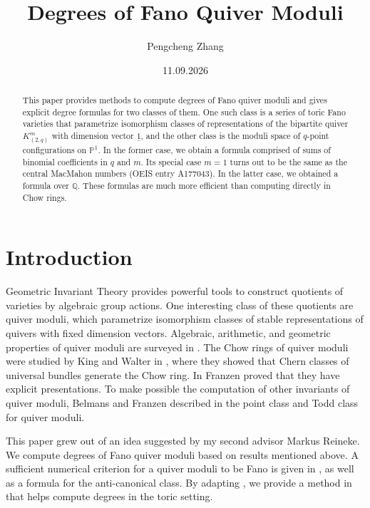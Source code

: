 \documentclass[11pt]{article}
\title{Degrees of Fano Quiver Moduli}
\author{Pengcheng Zhang}
\date{11.09.2026}
\begin{document}
\maketitle

\begin{abstract}
    This paper provides methods to compute degrees of Fano quiver moduli and gives explicit degree formulas for two classes of them. One such class is a series of toric Fano varieties that parametrize isomorphism classes of representations of the bipartite quiver \(K_{(2,q)}^m\) with dimension vector \(\underline{1}\), and the other class is the moduli space of \(q\)-point configurations on \(\mathbb{P}^1\). In the former case, we obtain a formula comprised of sums of binomial coefficients in \(q\) and \(m\). Its special case \(m=1\) turns out to be the same as the central MacMahon numbers (OEIS entry A177043). In the latter case, we obtained a formula over \(\mathbb{Q}\). These formulas are much more efficient than computing directly in Chow rings. 
\end{abstract}


\tableofcontents

\section{Introduction}\label{Section:1}

Geometric Invariant Theory provides powerful tools to construct quotients of varieties by algebraic group actions. One interesting class of these quotients are quiver moduli, which parametrize isomorphism classes of stable representations of quivers with fixed dimension vectors. Algebraic, arithmetic, and geometric properties of quiver moduli are surveyed in \cite{Reineke08mo}. The Chow rings of quiver moduli were studied by King and Walter in \cite{kingwalter1995chow}, where they showed that Chern classes of universal bundles generate the Chow ring. In \cite{franzen2015chow} Franzen proved that they have explicit presentations. To make possible the computation of other invariants of quiver moduli, Belmans and Franzen described in \cite{belmans2024chow} the point class and Todd class for quiver moduli. 

This paper grew out of an idea suggested by my second advisor Markus Reineke. We compute degrees of Fano quiver moduli based on results mentioned above. A sufficient numerical criterion for a quiver moduli to be Fano is given in \cite{frRe2021fano}, as well as a formula for the anti-canonical class. By adapting \cite[Lemma 25]{franzen2015chow}, we provide a method in  that helps compute degrees in the toric setting. 
\end{document}
